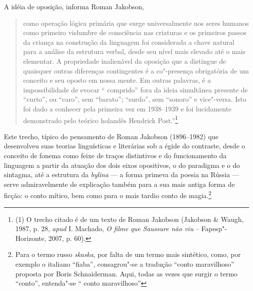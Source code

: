 A idéia de oposição, informa Roman Jakobson,

\begin{quote}
como operação lógica primária que surge
universalmente nos seres humanos como primeiro vislumbre de consciência
nas criaturas e os primeiros passos da criança na construção da
linguagem foi considerada a chave natural para a análise da estrutura
verbal, desde seu nível mais elevado até o mais elementar. A propriedade
inalienável da oposição que a distingue de quaisquer outras diferenças
contingentes é a co"-presença obrigatória de um conceito e seu oposto em
nossa mente. Em outras palavras, é a impossibilidade de evocar ``
comprido'' fora da ideia simultânea presente de ``curto'', ou ``caro'',
sem ``barato''; ``surdo'', sem ``sonoro'' e vice"-versa. Isto foi dado
a conhecer pela primeira vez em 1938--1939 e foi lucidamente demonstrado
pelo teórico holandês Hendrick Post.''\footnote{(1) O trecho citado é
  de um texto de Roman Jakobson (Jakobson \& Waugh, 1987, p.
  28, \emph{apud} I. Machado, \emph{O filme que Saussure não viu} -- Fapesp"-Horizonte, 2007, p. 60).}
\end{quote}



Este trecho, típico do pensamento de Roman Jakobson (1896--1982) que
desenvolveu suas teorias linguísticas e literárias sob a égide do
contraste, desde o conceito de fonema como feixe de traços distintivos e
do funcionamento da linguagem a partir da atuação dos dois eixos
opositivos, o do paradigma e o do sintagma, até a estrutura
da \emph{bylina} --- a forma primeva da poesia na Rússia --- serve
admiravelmente de explicação também para a sua mais antiga forma de
ficção: o conto mítico, bem como para o mais tardio conto de
magia.\footnote{Para o termo russo \emph{skaska}, por falta de um termo
  mais sintético, como, por exemplo o italiano ``fiaba'', consagrou"-se
  a tradução ``conto maravilhoso'' proposta por Boris Schnaiderman. Aqui, todas as vezes que surgir o termo ``conto'', entenda"-se ``
  conto maravilhoso''}



